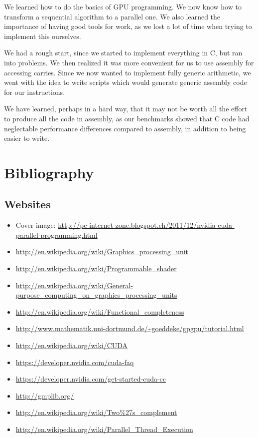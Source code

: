 \documentclass[12pt, a4paper]{report}
\begin{document}
\begin{sloppypar}
We learned how to do the basics of GPU programming. We now know how to
transform a sequential algorithm to a parallel one.
We also learned the importance of having good tools for work, as we lost a lot of
time when trying to implement this ourselves.

We had a rough start, since we started to implement everything in C, but ran into problems.
We then realized it was more convenient for us to use assembly for accessing carries.
Since we now wanted to implement fully generic arithmetic, we went with the idea
to write scripts which would generate generic assembly code for our instructions.

We have learned, perhaps in a hard way, that it may not be worth all the effort to
produce all the code in assembly, as our benchmarks showed that C code had neglectable
performance differences compared to assembly, in addition to being easier to write.

\chapter{Bibliography}
\section{Websites}
\begin{itemize}
\item Cover image: \url{http://pc-internet-zone.blogspot.ch/2011/12/nvidia-cuda-parallel-programming.html}
\item \url{http://en.wikipedia.org/wiki/Graphics_processing_unit}
\item \url{http://en.wikipedia.org/wiki/Programmable_shader}
\item \url{http://en.wikipedia.org/wiki/General-purpose_computing_on_graphics_processing_units}
\item \url{http://en.wikipedia.org/wiki/Functional_completeness}
\item \url{http://www.mathematik.uni-dortmund.de/~goeddeke/gpgpu/tutorial.html}
\item \url{http://en.wikipedia.org/wiki/CUDA}
\item \url{https://developer.nvidia.com/cuda-faq}
\item \url{https://developer.nvidia.com/get-started-cuda-cc}
\item \url{http://gmplib.org/}
\item \url{http://en.wikipedia.org/wiki/Two%27s_complement}
\item \url{http://en.wikipedia.org/wiki/Parallel_Thread_Execution}
\end{itemize}


\end{sloppypar}
\end{document}
